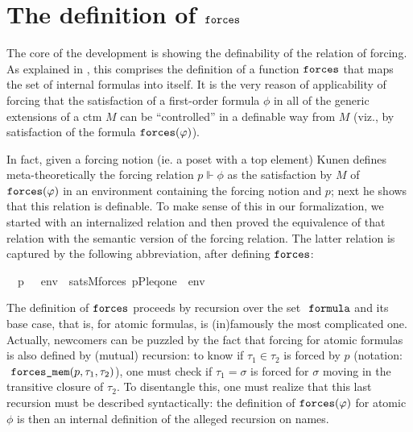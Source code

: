 \section{The definition of $\mathop{\mathtt{forces}}$}
\label{sec:definition-forces}

The core of the development is showing the definability of the
relation of forcing. As explained in
\cite[Sect.~8]{2019arXiv190103313G}, this comprises the 
definition of a function $\mathop{\mathtt{forces}}$ that maps the set of internal
formulas into itself. It is the very reason of applicability of
forcing that the satisfaction of a first-order formula  $\phi$ in all of the generic
extensions of a ctm $M$ can be ``controlled'' in a definable way from
$M$ (viz., by  satisfaction of the formula $\mathop{\mathtt{forces}}(\varphi)$). 

In fact, given a forcing notion (ie. a poset with a top element) Kunen
defines meta-theoretically the forcing relation $p \Vdash \phi$ as the
satisfaction by $M$ of $\mathop{\mathtt{forces}}(\varphi)$ in an environment containing
the forcing notion and $p$; next he shows that this relation is
definable. To make sense of this in our formalization, we started with
an internalized relation and then proved the equivalence of that
relation with the semantic version of the forcing relation.  The
latter relation is captured by the following abbreviation, after
defining $\mathop{\mathtt{forces}}$:
\begin{isabelle}
\ \ {\isachardoublequoteopen}p\ {\isasymtturnstile}\ {\isasymphi}\ env\ {\isasymequiv}\ sats{\isacharparenleft}M{\isacharcomma}forces{\isacharparenleft}{\isasymphi}{\isacharparenright}{\isacharcomma}\ {\isacharbrackleft}p{\isacharcomma}P{\isacharcomma}leq{\isacharcomma}one{\isacharbrackright}\ {\isacharat}\ env{\isacharparenright}{\isachardoublequoteclose}
\end{isabelle}

The definition of $\mathop{\mathtt{forces}}$ proceeds by recursion
over the set $\formula$ and its base case, that is, for
atomic formulas, is (in)famously the most complicated one. Actually,
newcomers can be puzzled by the fact that forcing for atomic
formulas is also defined by (mutual) recursion: to know if $\tau_1\in\tau_2$ is
forced by $p$ (notation: $\forcesmem(p,\tau_1,\tau_2)$), one must check if $\tau_1=\sigma$ is forced for $\sigma$
moving in the transitive closure of $\tau_2$. To disentangle this, one
must realize that this last recursion must be described syntactically:
the definition of $\mathop{\mathtt{forces}}(\varphi)$ for atomic $\phi$ is then an
internal definition of the alleged recursion on names. 

